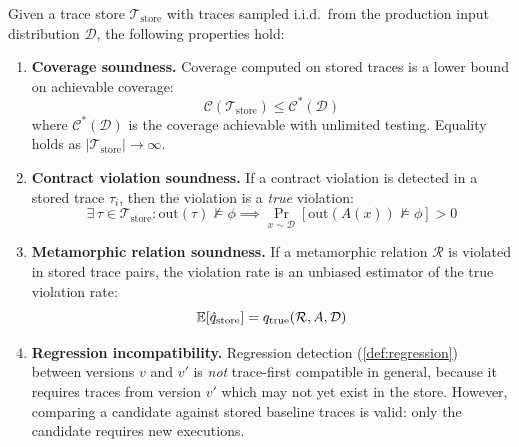 \begin{theorem}
\label{thm:trace-first}
Given a trace store $\mathcal{T}_{\mathrm{store}}$ with traces sampled
i.i.d.\ from the production input distribution $\mathcal{D}$, the
following properties hold:

\begin{enumerate}[leftmargin=*]
  \item \textbf{Coverage soundness.} Coverage computed on stored traces
    is a lower bound on achievable coverage:
    \begin{equation}
      \mathcal{C}(\mathcal{T}_{\mathrm{store}}) \leq
        \mathcal{C}^*(\mathcal{D})
    \end{equation}
    where $\mathcal{C}^*(\mathcal{D})$ is the coverage achievable with
    unlimited testing. Equality holds as
    $|\mathcal{T}_{\mathrm{store}}| \to \infty$.

  \item \textbf{Contract violation soundness.} If a contract violation
    is detected in a stored trace $\tau_i$, then the violation is a
    \emph{true} violation:
    \begin{equation}
      \exists\, \tau \in \mathcal{T}_{\mathrm{store}} :
      \mathrm{out}(\tau) \not\models \phi
      \implies
      \Pr_{x \sim \mathcal{D}}[\mathrm{out}(A(x)) \not\models \phi] > 0
    \end{equation}

  \item \textbf{Metamorphic relation soundness.} If a metamorphic
    relation $\mathcal{R}$ is violated in stored trace pairs, the
    violation rate is an unbiased estimator of the true violation rate:
    \begin{equation}
      \mathbb{E}[\hat{q}_{\mathrm{store}}] =
        q_{\mathrm{true}}(\mathcal{R}, A, \mathcal{D})
    \end{equation}

  \item \textbf{Regression incompatibility.} Regression detection
    (\cref{def:regression}) between versions $v$ and $v'$ is
    \emph{not} trace-first compatible in general, because it requires
    traces from version $v'$ which may not yet exist in the store.
    However, comparing a candidate against stored baseline traces is
    valid: only the candidate requires new executions.
\end{enumerate}
\end{theorem}

